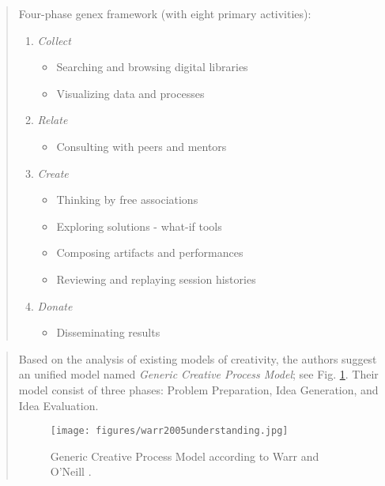 \begin{quote}
		Four-phase genex framework (with eight primary activities):
		
		\begin{enumerate}
		
		\item \emph{Collect}
			\begin{itemize}
			\item Searching and browsing digital libraries
			\item Visualizing data and processes
			\end{itemize}
		       
		\item \emph{Relate}
			\begin{itemize}
			\item Consulting with peers and mentors
			\end{itemize}
		       
		\item \emph{Create}
			\begin{itemize}
			\item Thinking by free associations
			\item Exploring solutions - what-if tools
			\item Composing artifacts and performances
			\item Reviewing and replaying session histories
			\end{itemize}
		       
		\item \emph{Donate}
			\begin{itemize}
			\item Disseminating results
			\end{itemize}
		\end{enumerate}
		
		       
		\end{quote}

% 		

		
		\begin{quote}
		\small
		Based on the analysis of existing models of creativity, the authors suggest
		an unified model named {\em Generic Creative Process Model}; see Fig. \ref{fig:warr2005understanding}.
		Their model consist of three phases: Problem Preparation, Idea Generation, and Idea Evaluation.
		\begin{figure}[htb]
		\begin{center}
		\texttt{[image: figures/warr2005understanding.jpg]}
		\caption{Generic Creative Process Model according to Warr and O'Neill \cite{warr2005understanding}.}
		\label{fig:warr2005understanding}
		\end{center}
		\end{figure}				
		\end{quote}		


